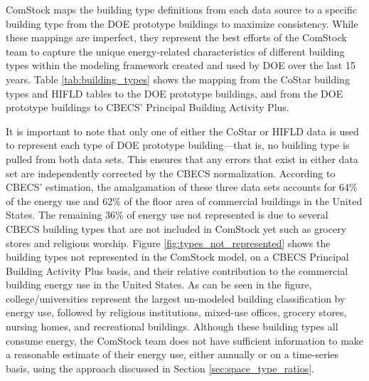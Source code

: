 ComStock maps the building type definitions from each data source to a specific building type from the DOE prototype buildings to maximize consistency. While these mappings are imperfect, they represent the best efforts of the ComStock team to capture the unique energy-related characteristics of different building types within the modeling framework created and used by DOE over the last 15 years. Table \ref{tab:building_types} shows the mapping from the CoStar building types and HIFLD tables to the DOE prototype buildings, and from the DOE prototype buildings to CBECS' Principal Building Activity Plus.



It is important to note that only one of either the CoStar or HIFLD data is used to represent each type of DOE prototype building---that is, no building type is pulled from both data sets. This ensures that any errors that exist in either data set are independently corrected by the CBECS normalization. According to CBECS' estimation, the amalgamation of these three data sets accounts for 64\% of the energy use and 62\% of the floor area of commercial buildings in the United States. The remaining 36\% of energy use not represented  is due to several CBECS building types that are not included in ComStock yet such as grocery stores and religious worship. Figure \ref{fig:types_not_represented} shows the building types not represented in the ComStock model, on a CBECS Principal Building Activity Plus basis, and their relative contribution to the commercial building energy use in the United States. As can be seen in the figure, college/universities represent the largest un-modeled building classification by energy use, followed by religious institutions, mixed-use offices, grocery stores, nursing homes, and recreational buildings. Although these building types all consume energy, the ComStock team does not have sufficient information to make a reasonable estimate of their energy use, either annually or on a time-series basis, using the approach discussed in Section \ref{sec:space_type_ratios}.

